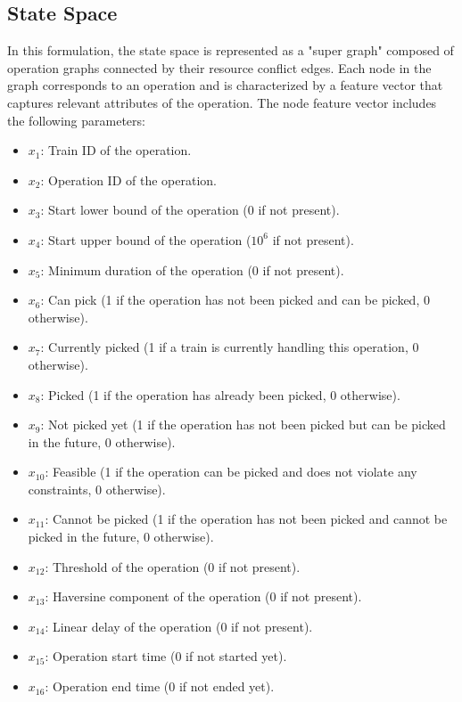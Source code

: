 \documentclass[runningheads]{llncs}
\begin{document}
\subsection{State Space}
\label{sss:state_space}

In this formulation, the state space is represented as a "super graph" composed of operation graphs connected by their resource conflict edges. 
Each node in the graph corresponds to an operation and is characterized by a feature vector that captures relevant attributes of the operation. 
The node feature vector includes the following parameters:

\begin{itemize}
    \item $x_1$: Train ID of the operation.
    \item $x_2$: Operation ID of the operation.
    \item $x_3$: Start lower bound of the operation (0 if not present).
    \item $x_4$: Start upper bound of the operation ($10^6$ if not present).
    \item $x_5$: Minimum duration of the operation (0 if not present).
    \item $x_6$: Can pick (1 if the operation has not been picked and can be picked, 0 otherwise).
    \item $x_7$: Currently picked (1 if a train is currently handling this operation, 0 otherwise).
    \item $x_8$: Picked (1 if the operation has already been picked, 0 otherwise).
    \item $x_9$: Not picked yet (1 if the operation has not been picked but can be picked in the future, 0 otherwise).
    \item $x_{10}$: Feasible (1 if the operation can be picked and does not violate any constraints, 0 otherwise).
    \item $x_{11}$: Cannot be picked (1 if the operation has not been picked and cannot be picked in the future, 0 otherwise).
    \item $x_{12}$: Threshold of the operation (0 if not present).
    \item $x_{13}$: Haversine component of the operation (0 if not present).
    \item $x_{14}$: Linear delay of the operation (0 if not present).
    \item $x_{15}$: Operation start time (0 if not started yet).
    \item $x_{16}$: Operation end time (0 if not ended yet).
\end{itemize}
\end{document}
